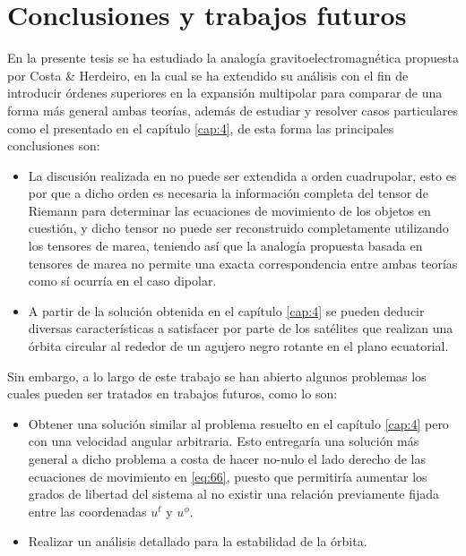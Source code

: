 \chapter{Conclusiones y trabajos futuros}

En la presente tesis se ha estudiado la analogía gravitoelectromagnética propuesta por Costa \& Herdeiro, en la cual se ha extendido su análisis con el fin de introducir órdenes superiores en la expansión multipolar para comparar de una forma más general ambas teorías, además de estudiar y resolver casos particulares como el presentado en el capítulo \ref{cap:4}, de esta forma las principales conclusiones son:
\begin{itemize}
\item La discusión realizada en \cite{Costa-Herdeiro} no puede ser extendida a orden cuadrupolar, esto es por que a dicho orden es necesaria la información completa del tensor de Riemann para determinar las ecuaciones de movimiento de los objetos en cuestión, y dicho tensor no puede ser reconstruido completamente utilizando los tensores de marea, teniendo así que la analogía propuesta basada en tensores de marea no permite una exacta correspondencia entre ambas teorías como sí ocurría en el caso dipolar.
\item A partir de la solución obtenida en el capítulo \ref{cap:4} se pueden deducir diversas características a satisfacer por parte de los satélites que realizan una órbita circular al rededor de un agujero negro rotante en el plano ecuatorial.
\end{itemize}

Sin embargo, a lo largo de este trabajo se han abierto algunos problemas los cuales pueden ser tratados en trabajos futuros, como lo son:
\begin{itemize}
\item Obtener una solución similar al problema resuelto en el capítulo \ref{cap:4} pero con una velocidad angular arbitraria. Esto entregaría una solución más general a dicho problema a costa de hacer no-nulo el lado derecho de las ecuaciones de movimiento en \eqref{eq:66}, puesto que permitiría aumentar los grados de libertad del sistema al no existir una relación previamente fijada entre las coordenadas $u^t$ y $u^{\phi}$.
\item Realizar un análisis detallado para la estabilidad de la órbita.
\end{itemize}